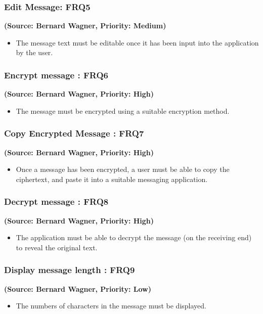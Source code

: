 \subsubsection{Edit Message: FRQ5}
\textbf{(Source: Bernard Wagner, Priority: Medium)}
\begin{itemize}
\item The message text must be editable once it has been input into the application by the user.
\end{itemize}
\subsubsection{Encrypt message : FRQ6}
\textbf{(Source: Bernard Wagner, Priority: High)}
\begin{itemize}
\item The message must be encrypted using a suitable encryption method.
\end{itemize}
\subsubsection{Copy Encrypted Message : FRQ7}
\textbf{(Source: Bernard Wagner, Priority: High)}
\begin{itemize}
\item Once a message has been encrypted, a user must be able to copy the ciphertext, and paste it into a suitable messaging application.
\end{itemize}
\subsubsection{Decrypt message : FRQ8}
\textbf{(Source: Bernard Wagner, Priority: High)}
\begin{itemize}
\item The application must be able to decrypt the message (on the receiving end) to reveal the original text.
\end{itemize}
\subsubsection{Display message length : FRQ9}
\textbf{(Source: Bernard Wagner, Priority: Low)}
\begin{itemize}
\item The numbers of characters in the message must be displayed.
\end{itemize}

